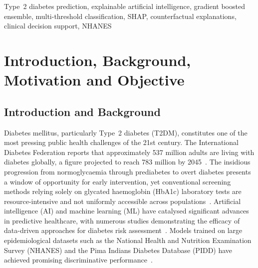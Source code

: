 \documentclass[conference]{IEEEtran}
\begin{document}
\begin{IEEEkeywords}
Type~2 diabetes prediction, explainable artificial intelligence, gradient boosted ensemble, multi-threshold classification, SHAP, counterfactual explanations, clinical decision support, NHANES
\end{IEEEkeywords}

\section{Introduction, Background, Motivation and Objective}

\subsection{Introduction and Background}

Diabetes mellitus, particularly Type~2 diabetes (T2DM), constitutes one of the most pressing public health challenges of the 21st century. The International Diabetes Federation reports that approximately 537 million adults are living with diabetes globally, a figure projected to reach 783 million by 2045~\cite{b1, b2}. The insidious progression from normoglycaemia through prediabetes to overt diabetes presents a window of opportunity for early intervention, yet conventional screening methods relying solely on glycated haemoglobin (HbA1c) laboratory tests are resource-intensive and not uniformly accessible across populations~\cite{b3, b4}. Artificial intelligence (AI) and machine learning (ML) have catalysed significant advances in predictive healthcare, with numerous studies demonstrating the efficacy of data-driven approaches for diabetes risk assessment~\cite{b1, b5, b6}. Models trained on large epidemiological datasets such as the National Health and Nutrition Examination Survey (NHANES) and the Pima Indians Diabetes Database (PIDD) have achieved promising discriminative performance~\cite{b3, b5, b7}.
\end{document}
